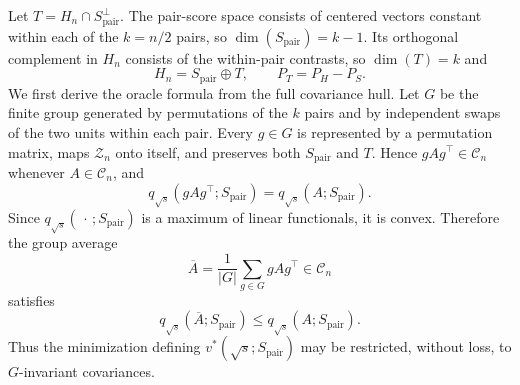 Let \(T=H_n\cap S_{\mathrm{pair}}^\perp\).  The pair-score space consists of centered vectors constant within each of the \(k=n/2\) pairs, so \(\dim(S_{\mathrm{pair}})=k-1\).  Its orthogonal complement in \(H_n\) consists of the within-pair contrasts, so \(\dim(T)=k\) and
\[
 H_n=S_{\mathrm{pair}}\mathbin\oplus T,
 \qquad P_T=P_H-P_S.
\]
We first derive the oracle formula from the full covariance hull.  Let \(G\) be the finite group generated by permutations of the \(k\) pairs and by independent swaps of the two units within each pair.  Every \(g\in G\) is represented by a permutation matrix, maps \(\mathcal Z_n\) onto itself, and preserves both \(S_{\mathrm{pair}}\) and \(T\).  Hence \(gAg^\top\in\mathcal C_n\) whenever \(A\in\mathcal C_n\), and
\[
 q_{\sqrt{s}}(gAg^\top;S_{\mathrm{pair}})
 =q_{\sqrt{s}}(A;S_{\mathrm{pair}}).
\]
Since \(q_{\sqrt{s}}(\,\cdot\,;S_{\mathrm{pair}})\) is a maximum of linear functionals, it is convex.  Therefore the group average
\[
 \overline A=\frac1{|G|}\sum_{g\in G}gAg^\top\in\mathcal C_n
\]
satisfies
\[
 q_{\sqrt{s}}(\overline A;S_{\mathrm{pair}})
 \leq q_{\sqrt{s}}(A;S_{\mathrm{pair}}).
 \tag{4}
\]
Thus the minimization defining \(v^*(\sqrt{s};S_{\mathrm{pair}})\) may be restricted, without loss, to \(G\)-invariant covariances.

